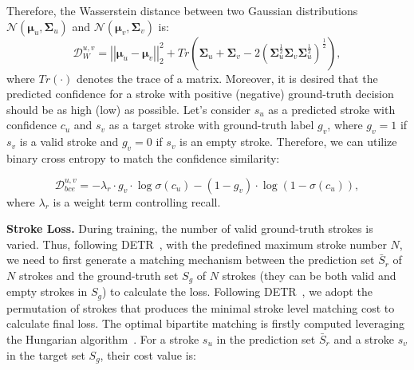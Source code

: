 \documentclass[10pt,twocolumn,letterpaper]{article}
\begin{document}
Therefore, the Wasserstein distance between two Gaussian distributions $\mathcal{N}(\mathbf{\mu}_u,\mathbf{\Sigma}_u)$ and $\mathcal{N}(\mathbf{\mu}_v,\mathbf{\Sigma}_v)$ is:
\begin{equation}
    \mathcal{D}^{{u,v}}_{W}=\left|\left|\mathbf{\mu}_u-\mathbf{\mu}_v\right|\right|_2^2+Tr(\mathbf{\Sigma}_u+\mathbf{\Sigma}_v-2(\mathbf{\Sigma}_u^{\frac{1}{2}}\mathbf{\Sigma}_v\mathbf{\Sigma}_u^{\frac{1}{2}})^{\frac{1}{2}}),\label{l_w}
\end{equation}
where $Tr(\cdot)$ denotes the trace of a matrix.
Moreover, it is desired that the predicted confidence for a stroke with positive (negative) ground-truth decision should be as high (low) as possible.
Let's consider $s_u$ as a predicted stroke with confidence $c_u$ and $s_v$ as a target stroke with ground-truth label $g_v$, where $g_v = 1$ if $s_v$ is a valid stroke and $g_v = 0$ if $s_v$ is an empty stroke.
Therefore, we can utilize binary cross entropy to match the confidence similarity:


\begin{equation}
    \mathcal{D}^{u,v}_{bce}=-\lambda_r \cdot g_v\cdot \log\sigma(c_u)-(1-g_v)\cdot \log (1-\sigma(c_u)),
\end{equation}
where $\lambda_r$ is a weight term controlling recall.

\noindent
\textbf{Stroke Loss.}
During training, the number of valid ground-truth strokes is varied. Thus, following DETR~\cite{carion2020endtoend}, with the predefined maximum stroke number $N$, we need to first generate a matching mechanism between the prediction set $\bar{S}_r$ of $N$ strokes and the ground-truth set $S_g$ of $N$ strokes (they can be both valid and empty strokes in $S_g$) to calculate the loss. 
Following DETR~\cite{carion2020endtoend}, we adopt the permutation of strokes that produces the minimal stroke level matching cost to calculate final loss. 
The optimal bipartite matching is firstly computed leveraging the Hungarian algorithm~\cite{kuhn1955hungarian}.
For a stroke $s_u$ in the prediction set $\bar{S}_r$ and a stroke $s_v$ in the target set $S_g$, their cost value is:
\end{document}
